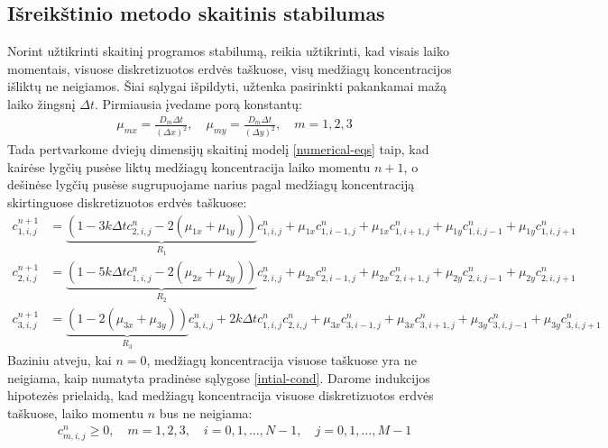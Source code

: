 \newpage
\subsection{Išreikštinio metodo skaitinis stabilumas}

Norint užtikrinti skaitinį programos stabilumą, reikia užtikrinti, kad visais laiko momentais, visuose diskretizuotos erdvės taškuose, visų medžiagų koncentracijos išliktų ne neigiamos. Šiai sąlygai išpildyti, užtenka pasirinkti pakankamai mažą laiko žingsnį $\Delta t$. Pirmiausia įvedame porą konstantų:
\begin{align*}
\mu_{mx} = \frac{D_m\Delta t}{(\Delta x)^2}, \quad
\mu_{my} = \frac{D_m\Delta t}{(\Delta y)^2}, \quad m = 1, 2, 3
\end{align*}
Tada pertvarkome dviejų dimensijų skaitinį modelį \eqref{numerical-eqs} taip, kad kairėse lygčių pusėse liktų medžiagų koncentracija laiko momentu $n+1$, o dešinėse lygčių pusėse sugrupuojame narius pagal medžiagų koncentraciją skirtinguose diskretizuotos erdvės taškuose:
\begin{subequations} \label{eqs:r-coefs}
  \begin{align}
  c^{n+1}_{1,i,j}&=
  \underbrace{(1-3k\Delta tc^{n}_{2,i,j}-2(\mu_{1x}+\mu_{1y}))}_{R_1}c^n_{1,i,j}
  +\mu_{1x}c^n_{1,i-1,j}+\mu_{1x}c^n_{1,i+1,j}+\mu_{1y}c^n_{1,i,j-1}+\mu_{1y}c^n_{1,i,j+1} \label{r-coefs1}\\
  c^{n+1}_{2,i,j}&=
  \underbrace{(1-5k\Delta tc^{n}_{1,i,j}-2(\mu_{2x}+\mu_{2y}))}_{R_2}c^n_{2,i,j}
  +\mu_{2x}c^n_{2,i-1,j}+\mu_{2x}c^n_{2,i+1,j}+\mu_{2y}c^n_{2,i,j-1}+\mu_{2y}c^n_{2,i,j+1} \label{r-coefs2}\\
  c^{n+1}_{3,i,j}&=
  \underbrace{(1-2(\mu_{3x} + \mu_{3y}))}_{R_3}c^n_{3,i,j}+2k\Delta tc^{n}_{1,i,j}c^{n}_{2,i,j} 
  +\mu_{3x}c^n_{3,i-1,j}+\mu_{3x}c^n_{3,i+1,j}
  +\mu_{3y}c^n_{3,i,j-1}+\mu_{3y}c^n_{3,i,j+1}
  \label{r-coefs3}
  \end{align}
\end{subequations}
Baziniu atveju, kai $n=0$, medžiagų koncentracija visuose taškuose yra ne neigiama, kaip numatyta pradinėse sąlygose \eqref{intial-cond}. Darome indukcijos hipotezės prielaidą, kad medžiagų koncentracija visuose diskretizuotos erdvės taškuose, laiko momentu $n$ bus ne neigiama:
\begin{align} \label{induction-assumption}
  c^n_{m,i,j} \geqslant 0, \quad m=1,2,3,\quad i=0,1,\dots,N-1,\quad j=0,1,\dots,M-1
\end{align}
